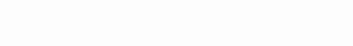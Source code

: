 \documentclass{resume}
\begin{document}







\vspace{-5pt} %
\begin{center}
    \tiny{\textcolor{white}{
      Skills \& Tools: Kafka, Tableau, Power BI, Git, Docker, PostgreSQL, NoSQL, Java, AWS, Azure, Google Cloud Platform, HTML, CSS, JavaScript/Typescript, React, Next.js, Node.js, Express, MongoDB
    }}
\end{center}

%
%
\end{document}
